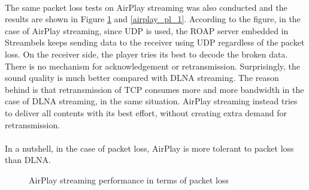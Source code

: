 \\
The same packet loss tests on AirPlay streaming was also conducted and the
results are shown in Figure \ref{airplay_pl} and \ref{airplay_pl_1}. According
to the figure, in the case of AirPlay streaming, since UDP is used, the ROAP server embedded in Streambels keeps sending data to the receiver using UDP regardless of  the packet loss. On the receiver side, the player tries its best to decode the broken data. There is no mechanism for acknowledgement or retransmission. Surprisingly, the sound quality is much better compared with DLNA streaming. The reason behind is that retransmission of TCP consumes more and more bandwidth in the case of DLNA streaming, in the same situation. AirPlay streaming instead tries to deliver all contents with its best effort, without creating extra demand for retransmission.\\
\\
In a nutshell, in the case of packet loss, AirPlay is more tolerant to packet loss than DLNA.
\begin{figure}[hb]
\caption{AirPlay streaming performance in terms of packet loss \label{airplay_pl}}
\end{figure}
